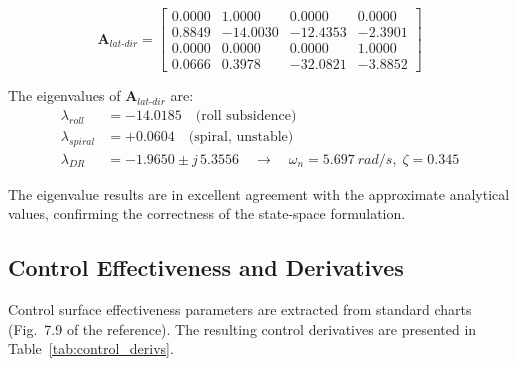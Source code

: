 \begin{equation}
  \mathbf{A}_{lat\text{-}dir} =
  \begin{bmatrix}
     0.0000 &  1.0000 &  0.0000 &  0.0000 \\
     0.8849 & -14.0030 & -12.4353 & -2.3901 \\
     0.0000 &  0.0000 &  0.0000 &  1.0000 \\
     0.0666 &  0.3978 & -32.0821 & -3.8852
  \end{bmatrix}
  \label{eq:Alat}
\end{equation}

The eigenvalues of $\mathbf{A}_{lat\text{-}dir}$ are:
\begin{align}
  \lambda_{roll}   &= -14.0185 \quad\text{(roll subsidence)} \\
  \lambda_{spiral} &= +0.0604  \quad\text{(spiral, unstable)} \\
  \lambda_{DR}     &= -1.9650 \pm j\,5.3556
  \quad\rightarrow\quad \omega_{n} = \SI{5.697}{rad/s},\; \zeta = 0.345
\end{align}

The eigenvalue results are in excellent agreement with the approximate analytical values, confirming the correctness of the state-space formulation.

\subsection{Control Effectiveness and Derivatives}
\label{subsec:control}

Control surface effectiveness parameters are extracted from standard charts (Fig.~7.9 of the reference). The resulting control derivatives are presented in Table~\ref{tab:control_derivs}.

